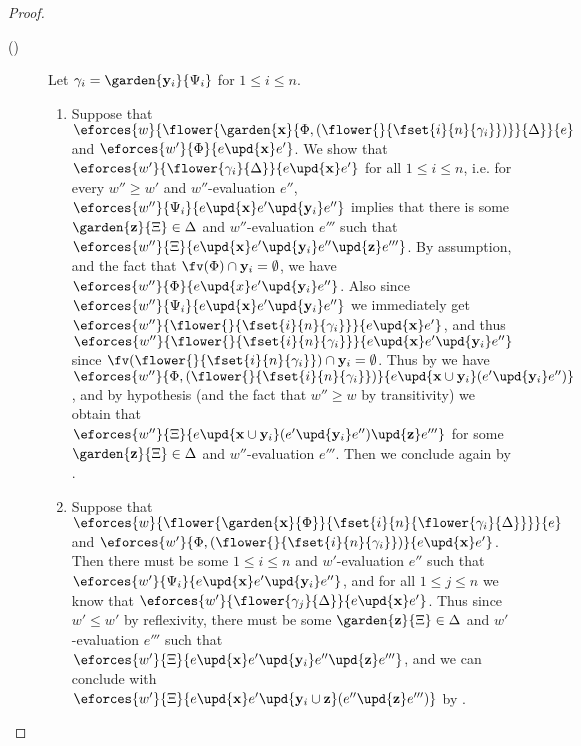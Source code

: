 \begin{scope}
\begin{proof}
\begin{description}
    \item[()]
      Let $\gamma_i = \garden{\by_i}{\Psi_i}$ for $1 \leq i \leq n$.
      \begin{enumerate}
        \item Suppose that
        $\eforces{w}{\flower{\garden{\bx}{\Phi,(\flower{}{\fset{i}{n}{\gamma_i}})}}{\Delta}}{e}$
        and $\eforces{w'}{\Phi}{e \upd{\bx} e'}$. We show that
        $\eforces{w'}{\flower{\gamma_i}{\Delta}}{e \upd{\bx} e'}$ for all $1
        \leq i \leq n$, i.e. for every $w'' \geq w'$ and $w''$-evaluation $e''$,
        $\eforces{w''}{\Psi_i}{e \upd{\bx} e' \upd{\by_i} e''}$ implies that
        there is some $\garden{\bz}{\Xi} \in \Delta$ and $w''$-evaluation $e'''$
        such that $\eforces{w''}{\Xi}{e \upd{\bx} e' \upd{\by_i} e'' \upd{\bz}
        e'''}$. By assumption,  and the fact that
        $\fv(\Phi) \cap \by_i = \emptyset$, we have $\eforces{w''}{\Phi}{e
        \upd{x} e' \upd{\by_i} e''}$. Also since $\eforces{w''}{\Psi_i}{e
        \upd{\bx} e' \upd{\by_i} e''}$ we immediately get
        $\eforces{w''}{\flower{}{\fset{i}{n}{\gamma_i}}}{e \upd{\bx} e'}$, and
        thus $\eforces{w''}{\flower{}{\fset{i}{n}{\gamma_i}}}{e \upd{\bx} e'
        \upd{\by_i} e''}$ since $\fv(\flower{}{\fset{i}{n}{\gamma_i}}) \cap
        \by_i = \emptyset$. Thus by  we have
        $\eforces{w''}{\Phi,(\flower{}{\fset{i}{n}{\gamma_i}})}{e \upd{\bx \cup
        \by_i} (e' \upd{\by_i} e'')}$, and by hypothesis (and the fact that $w''
        \geq w$ by transitivity) we obtain that $\eforces{w''}{\Xi}{e \upd{\bx
        \cup \by_i} (e' \upd{\by_i} e'') \upd{\bz} e'''}$ for some
        $\garden{\bz}{\Xi} \in \Delta$ and $w''$-evaluation $e'''$. Then we
        conclude again by .

        \item Suppose that
        $\eforces{w}{\flower{\garden{\bx}{\Phi}}{{\fset{i}{n}{\flower{\gamma_i}{\Delta}}}}}{e}$
        and $\eforces{w'}{\Phi,(\flower{}{\fset{i}{n}{\gamma_i}})}{e \upd{\bx}
        e'}$. Then there must be some $1 \leq i \leq n$ and $w'$-evaluation
        $e''$ such that $\eforces{w'}{\Psi_i}{e \upd{\bx} e' \upd{\by_i} e''}$,
        and for all $1 \leq j \leq n$ we know that
        $\eforces{w'}{\flower{\gamma_j}{\Delta}}{e \upd{\bx} e'}$. Thus since
        $w' \leq w'$ by reflexivity, there must be some $\garden{\bz}{\Xi} \in
        \Delta$ and $w'$-evaluation $e'''$ such that $\eforces{w'}{\Xi}{e
        \upd{\bx} e' \upd{\by_i} e'' \upd{\bz} e'''}$, and we can conclude with
        $\eforces{w'}{\Xi}{e \upd{\bx} e' \upd{\by_i \cup \bz} (e'' \upd{\bz}
        e''')}$ by .
      \end{enumerate} 
  \end{description}
\end{proof}


\end{scope}
